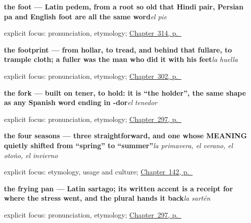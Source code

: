 \noindent\begin{minipage}[t]{\linewidth}
\raggedright
\textbf{the foot — Latin pedem, from a root so old that Hindi pair, Persian pa and English foot are all the same word}\enspace\emph{el pie}\par
\footnotesize explicit focus: pronunciation, etymology; \hyperref[ch:brazo-y-pie]{Chapter~314, p.~\pageref*{ch:brazo-y-pie}}
\end{minipage}\par\smallskip

\noindent\begin{minipage}[t]{\linewidth}
\raggedright
\textbf{the footprint — from hollar, to tread, and behind that fullare, to trample cloth; a fuller was the man who did it with his feet}\enspace\emph{la huella}\par
\footnotesize explicit focus: pronunciation, etymology; \hyperref[ch:calle-y-faro]{Chapter~302, p.~\pageref*{ch:calle-y-faro}}
\end{minipage}\par\smallskip

\noindent\begin{minipage}[t]{\linewidth}
\raggedright
\textbf{the fork — built on tener, to hold: it is \textquotedblleft{}the holder\textquotedblright{}, the same shape as any Spanish word ending in -dor}\enspace\emph{el tenedor}\par
\footnotesize explicit focus: pronunciation, etymology; \hyperref[ch:la-cocina]{Chapter~297, p.~\pageref*{ch:la-cocina}}
\end{minipage}\par\smallskip

\noindent\begin{minipage}[t]{\linewidth}
\raggedright
\textbf{the four seasons — three straightforward, and one whose MEANING quietly shifted from \textquotedblleft{}spring\textquotedblright{} to \textquotedblleft{}summer\textquotedblright{}}\enspace\emph{la primavera, el verano, el otoño, el invierno}\par
\footnotesize explicit focus: etymology, usage and culture; \hyperref[ch:spanish-seasons]{Chapter~142, p.~\pageref*{ch:spanish-seasons}}
\end{minipage}\par\smallskip

\noindent\begin{minipage}[t]{\linewidth}
\raggedright
\textbf{the frying pan — Latin sartago; its written accent is a receipt for where the stress went, and the plural hands it back}\enspace\emph{la sartén}\par
\footnotesize explicit focus: pronunciation, etymology; \hyperref[ch:la-cocina]{Chapter~297, p.~\pageref*{ch:la-cocina}}
\end{minipage}\par\smallskip

